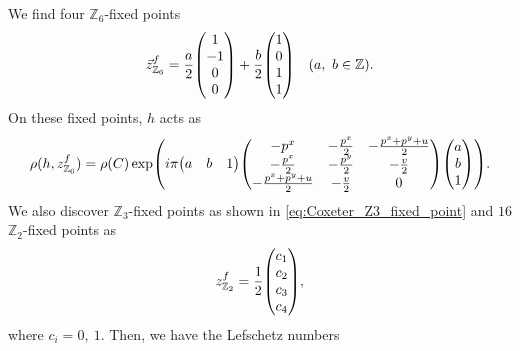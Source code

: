 \documentclass[11pt]{article}
\newcommand{\Lef}{Lefschetz }
\begin{document}


We find four $\mathbb{Z}_6$-fixed points 
\begin{align}
    \vec{z}^f_{\mathbb{Z}_6}= \frac{a}{2}\mqty(1 \\ -1 \\ 0 \\ 0 )+\frac{b}{2}\mqty( 1 \\ 0 \\ 1 \\ 1 )\quad (a,~b\in \mathbb{Z}).
\end{align}
On these fixed points, $h$ acts as
\begin{align}
    \rho(h,z^f_{\mathbb{Z}_6})= \rho(C) \exp(i\pi \mqty(a& b&1) \mqty( -p^x & -\frac{p^x}{2} & -\frac{p^x+p^y+u}{2} \\  -\frac{p^x}{2}& -\frac{p^y}{2}   & -\frac{v}{2} \\  -\frac{p^x+p^y+u}{2}  & -\frac{v}{2} &0 ) \mqty(a\\ b\\1)).
\end{align}
We also discover $\mathbb{Z}_3$-fixed points as shown in \eqref{eq:Coxeter_Z3_fixed_point} and $16$ $\mathbb{Z}_2$-fixed points as
\begin{align}
    z^f_{\mathbb{Z}_2}=\frac{1}{2} \mqty(c_1\\ c_2 \\ c_3 \\ c_4),
\end{align}
where $c_i=0,~1$. Then, we have the \Lef numbers
\end{document}
